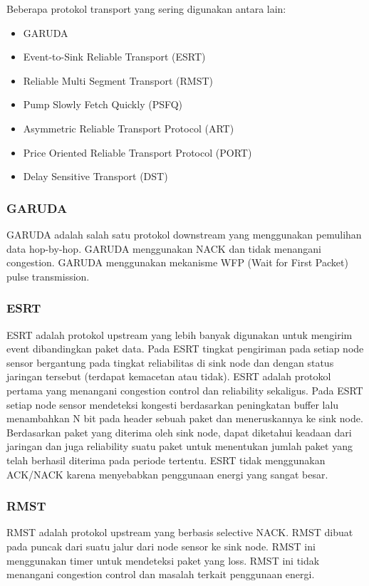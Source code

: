 Beberapa protokol transport yang sering digunakan antara lain:
\begin{itemize}
	\item GARUDA
	\item Event-to-Sink Reliable Transport (ESRT)
	\item Reliable Multi Segment Transport (RMST)
	\item Pump Slowly Fetch Quickly (PSFQ)
	\item Asymmetric Reliable Transport Protocol (ART)
	\item Price Oriented Reliable Transport Protocol (PORT)
	\item Delay Sensitive Transport (DST)
\end{itemize}

\subsubsection{GARUDA}
GARUDA adalah salah satu protokol downstream yang menggunakan pemulihan data hop-by-hop. GARUDA menggunakan NACK dan tidak menangani congestion. GARUDA menggunakan mekanisme WFP (Wait for First Packet) pulse transmission.

\subsubsection{ESRT}
ESRT adalah protokol upstream yang lebih banyak digunakan untuk mengirim event dibandingkan paket data. Pada ESRT tingkat pengiriman pada setiap node sensor bergantung pada tingkat reliabilitas di sink node dan dengan status jaringan tersebut (terdapat kemacetan atau tidak). ESRT adalah protokol pertama yang menangani congestion control dan reliability sekaligus. Pada ESRT setiap node sensor mendeteksi kongesti berdasarkan peningkatan buffer lalu menambahkan N bit pada header sebuah paket dan meneruskannya ke sink node. Berdasarkan paket yang diterima oleh sink node, dapat diketahui keadaan dari jaringan dan juga reliability suatu paket untuk menentukan jumlah paket yang telah berhasil diterima pada periode tertentu. ESRT tidak menggunakan ACK/NACK karena menyebabkan penggunaan energi yang sangat besar.

\subsubsection{RMST}
RMST adalah protokol upstream yang berbasis selective NACK. RMST dibuat pada puncak dari suatu jalur dari node sensor ke sink node. RMST ini menggunakan timer untuk mendeteksi paket yang loss. RMST ini tidak menangani congestion control dan masalah terkait penggunaan energi.


